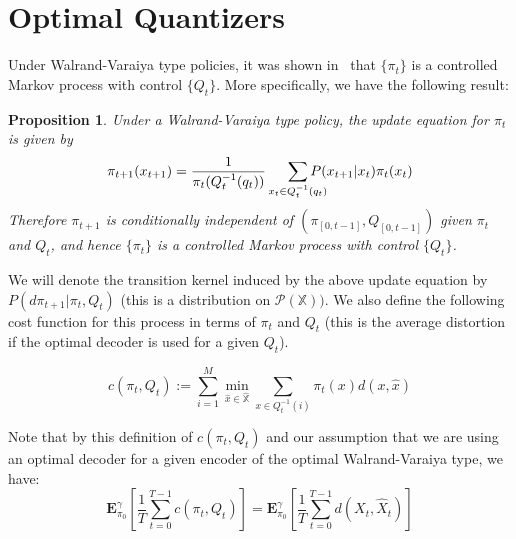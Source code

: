 \documentclass[conference, draftcls, onecolumn]{IEEEtran}
\newtheorem{proposition}{Proposition}
\begin{document}
\section{Optimal Quantizers}\label{section:optimal quantizers}

Under Walrand-Varaiya type policies, it was shown in~\cite{Linder} that \( \{\pi_t\} \) is a controlled Markov process with control \( \{Q_t\} \). More specifically, we have the following result:
\begin{proposition}\cite{Linder}
    Under a Walrand-Varaiya type policy, the update equation for \(\pi_t\) is given by
    \begin{equation}
        \pi_{t+1}(x_{t+1}) = \frac{1}{\pi_t(Q_t^{-1}(q_t))}\smashoperator[r]{\sum_{x_t \in Q_t^{-1}(q_t)}}P(x_{t+1}|x_t)\pi_t(x_t)\label{eq:1}
    \end{equation}
    Therefore \( \pi_{t+1} \) is conditionally independent of \( (\pi_{[0,t-1]}, Q_{[0,t-1]}) \) given \( \pi_t \) and \( Q_t \), and hence \( \{\pi_t\} \) is a controlled Markov process with control \( \{Q_t\} \).
\end{proposition}

We will denote the transition kernel induced by the above update equation by \( P(d\pi_{t+1} | \pi_t, Q_t) \) (this is a distribution on \( \mathcal{P(\mathbb{X})}) \). We also define the following cost function for this process in terms of \( \pi_t \) and \( Q_t \) (this is the average distortion if the optimal decoder is used for a given \(Q_t\)).

\begin{equation}\label{eq:cost}
    c(\pi_t, Q_t) := \sum_{i=1}^M \min_{\hat{x} \in \hat{\mathbb{X}}} \sum_{x \in Q_t^{-1}(i)} \pi_t(x)d(x,\hat{x})
\end{equation}

Note that by this definition of \( c(\pi_t,Q_t) \) and our assumption that we are using an optimal decoder for a given encoder of the optimal Walrand-Varaiya type, we have:
\[\mathbf{E}_{\pi_0}^{\gamma}\left[\frac{1}{T}\sum_{t=0}^{T-1}c(\pi_t,Q_t)\right] = \mathbf{E}_{\pi_0}^{\gamma}\left[\frac{1}{T}\sum_{t=0}^{T-1}d(X_t,\hat{X}_t)\right]\]

\end{document}

